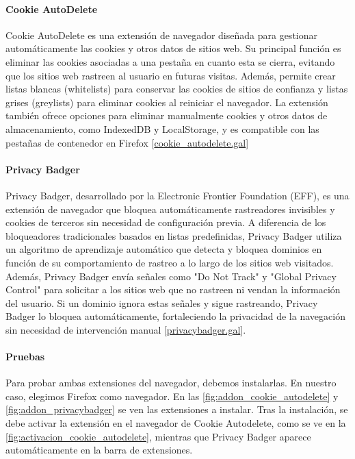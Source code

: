 \paragraph{Cookie AutoDelete}

Cookie AutoDelete es una extensión de navegador diseñada para gestionar automáticamente las cookies y otros datos de sitios web. Su principal función es eliminar las cookies asociadas a una pestaña en cuanto esta se cierra, evitando que los sitios web rastreen al usuario en futuras visitas. Además, permite crear listas blancas (whitelists) para conservar las cookies de sitios de confianza y listas grises (greylists) para eliminar cookies al reiniciar el navegador. La extensión también ofrece opciones para eliminar manualmente cookies y otros datos de almacenamiento, como IndexedDB y LocalStorage, y es compatible con las pestañas de contenedor en Firefox [\url{cookie_autodelete.gal}]

\paragraph{Privacy Badger}

Privacy Badger, desarrollado por la Electronic Frontier Foundation (EFF), es una extensión de navegador que bloquea automáticamente rastreadores invisibles y cookies de terceros sin necesidad de configuración previa. A diferencia de los bloqueadores tradicionales basados en listas predefinidas, Privacy Badger utiliza un algoritmo de aprendizaje automático que detecta y bloquea dominios en función de su comportamiento de rastreo a lo largo de los sitios web visitados. Además, Privacy Badger envía señales como "Do Not Track" y "Global Privacy Control" para solicitar a los sitios web que no rastreen ni vendan la información del usuario. Si un dominio ignora estas señales y sigue rastreando, Privacy Badger lo bloquea automáticamente, fortaleciendo la privacidad de la navegación sin necesidad de intervención manual [\url{privacybadger.gal}]. 

\paragraph{Pruebas}

Para probar ambas extensiones del navegador, debemos instalarlas. En nuestro caso, elegimos Firefox como navegador. En las \ref{fig:addon_cookie_autodelete} y \ref{fig:addon_privacybadger} se ven las extensiones a instalar. Tras la instalación, se debe activar la extensión en el navegador de Cookie Autodelete, como se ve en la \ref{fig:activacion_cookie_autodelete}, mientras que Privacy Badger aparece automáticamente en la barra de extensiones. 

